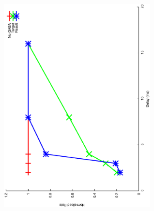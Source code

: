 \documentclass{article}
\begin{document}
\includegraphics[keepaspectratio=true,angle=-90,width=0.6\textwidth]{DS_ClickRecovery_result.20.eps}\clearpage
\end{document}
